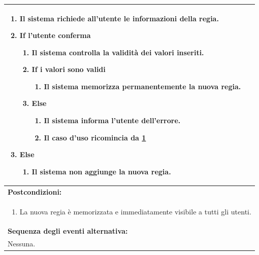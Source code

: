 \documentclass{article}
\begin{document}
\begin{table}[H]
\begin{tabular}{|p{\linewidth}|}
\begin{enumerate}
                            \item Il sistema richiede all'utente le informazioni della regia. \label{beginning}
                            \item \textbf{If} l'utente conferma
                                \begin{enumerate}
                                    \item Il sistema controlla la validità dei valori inseriti.
                                    \item \textbf{If} i valori sono validi 
                                        \begin{enumerate}
                                            \item Il sistema memorizza permanentemente la nuova regia.
                                        \end{enumerate}
                                    \item \textbf{Else}
                                        \begin{enumerate}
                                            \item Il sistema informa l'utente dell'errore.
                                            \item Il caso d'uso ricomincia da \ref{beginning}
                                        \end{enumerate}
                                \end{enumerate}
                            \item \textbf{Else}
                                \begin{enumerate}
                                    \item Il sistema non aggiunge la nuova regia.
                                \end{enumerate}
                        \end{enumerate} \\
                        \hline
                        \cellcolor{gray!20}
                        \textbf{Postcondizioni:} \\
                        \cellcolor{gray!20}
                        \begin{minipage}{\linewidth}
                            \begin{enumerate}
                                \item La nuova regia è memorizzata e immediatamente visibile a tutti gli utenti.
                            \end{enumerate}
                        \end{minipage} \\
                        \hline
                        \textbf{Sequenza degli eventi alternativa:} \\
                        Nessuna. \\
                        \hline
                    \end{tabular}
                \end{table}
\end{document}
